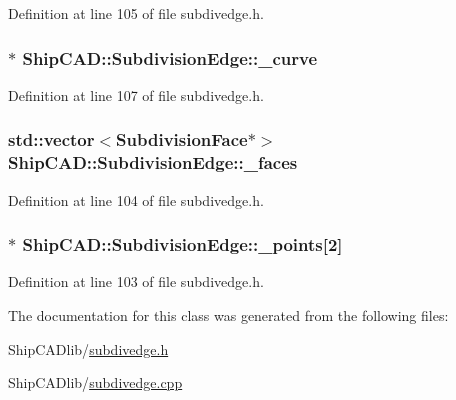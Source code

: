 Definition at line 105 of file subdivedge.\-h.

\hypertarget{classShipCAD_1_1SubdivisionEdge_a1863a7ef84b2d73f0e1407f3536bbc9f}{
\subsubsection[{\-\_\-curve}]{$\ast$ Ship\-C\-A\-D\-::\-Subdivision\-Edge\-::\-\_\-curve\hspace{0.3cm}{\ttfamily [protected]}}}\label{classShipCAD_1_1SubdivisionEdge_a1863a7ef84b2d73f0e1407f3536bbc9f}


Definition at line 107 of file subdivedge.\-h.

\hypertarget{classShipCAD_1_1SubdivisionEdge_aa1da730fcb3ac49c92e803a0b336d855}{
\subsubsection[{\-\_\-faces}]{\setlength{\rightskip}{0pt plus 5cm}std\-::vector$<${\bf Subdivision\-Face}$\ast$$>$ Ship\-C\-A\-D\-::\-Subdivision\-Edge\-::\-\_\-faces\hspace{0.3cm}{\ttfamily [protected]}}}\label{classShipCAD_1_1SubdivisionEdge_aa1da730fcb3ac49c92e803a0b336d855}


Definition at line 104 of file subdivedge.\-h.

\hypertarget{classShipCAD_1_1SubdivisionEdge_a55519f9d615d6bd701c10c48259525ac}{
\subsubsection[{\-\_\-points}]{$\ast$ Ship\-C\-A\-D\-::\-Subdivision\-Edge\-::\-\_\-points\mbox{[}2\mbox{]}\hspace{0.3cm}{\ttfamily [protected]}}}\label{classShipCAD_1_1SubdivisionEdge_a55519f9d615d6bd701c10c48259525ac}


Definition at line 103 of file subdivedge.\-h.



The documentation for this class was generated from the following files\-:\begin{DoxyCompactItemize}
\item 
Ship\-C\-A\-Dlib/\hyperlink{subdivedge_8h}{subdivedge.\-h}\item 
Ship\-C\-A\-Dlib/\hyperlink{subdivedge_8cpp}{subdivedge.\-cpp}\end{DoxyCompactItemize}
